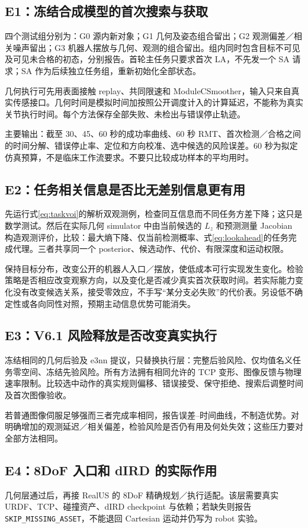 \documentclass[UTF8,fontset=fandol,11pt,a4paper]{ctexart}
\theoremstyle{plain}
\theoremstyle{definition}
\theoremstyle{remark}
\numberwithin{equation}{section}
\newcommand{\code}[1]{\begingroup\small\nolinkurl{#1}\endgroup}
\begin{document}
\subsection{E1：冻结合成模型的首次搜索与获取}
四个测试组分别为：G0 源内新对象；G1 几何及姿态组合留出；G2 观测偏差／相关噪声留出；G3 机器人摆放与几何、观测的组合留出。组内同时包含目标不可见及可见未合格的初态，分别报告。首轮主任务只要求首次 LA，不先发一个 SA 请求；SA 作为后续独立任务组，重新初始化全部状态。

几何执行可先用表面接触 replay、共同限速和 ModuleCSmoother，输入只来自真实传感接口。几何时间是模拟时间加按照公开调度计入的计算延迟，不能称为真实关节执行时间。每个方法保存全部失败、未检出与错误停止轨迹。

主要输出：截至 30、45、60 秒的成功率曲线、60 秒 RMT、首次检测／合格之间的时间分解、错误停止率、定位和方向校准、选中候选的风险误差。60 秒为拟定仿真预算，不是临床工作流要求。不要只比较成功样本的平均用时。

\subsection{E2：任务相关信息是否比无差别信息更有用}
先运行式\eqref{eq:taskvoi}的解析双观测例，检查同互信息而不同任务方差下降；这只是数学测试。然后在实际几何 simulator 中由当前候选的 $L_z$ 和预测测量 Jacobian 构造观测评价，比较：最大熵下降、仅当前检测概率、式\eqref{eq:lookahead}的任务完成代理。三者共享同一个 posterior、候选动作、代价、有限深度和运动权限。

保持目标分布，改变公开的机器人入口／摆放，使低成本可行实现发生变化。检验策略是否相应改变观察方向，以及变化是否减少真实首次获取时间。若实际能力变化没有改变候选关系，接受零效应，不手写“某分支必失败”的代价表。另设低不确定性或各向同性对照，预期主动信息优势可能消失。

\subsection{E3：V6.1 风险释放是否改变真实执行}
冻结相同的几何后验及 e3nn 提议，只替换执行层：完整后验风险、仅均值名义任务零空间、冻结先验风险。所有方法拥有相同允许的 TCP 变形、图像反馈与物理速率限制。比较选中动作的真实规则偏移、错误接受、保守拒绝、搜索后调整时间及首次图像验收。

若普通图像伺服足够强而三者完成率相同，报告误差--时间曲线，不制造优势。对明确增加的观测延迟／相关偏差，检验风险是否仍有用及何处失效；这些压力要对全部方法相同。

\subsection{E4：8DoF 入口和 dIRD 的实际作用}
几何层通过后，再接 RealUS 的 8DoF 精确规划／执行适配。该层需要真实 URDF、TCP、碰撞资产、dIRD checkpoint 与依赖；若缺失则报告 \code{SKIP\_MISSING\_ASSET}，不能退回 Cartesian 运动并仍写为 robot 实验。
\end{document}
